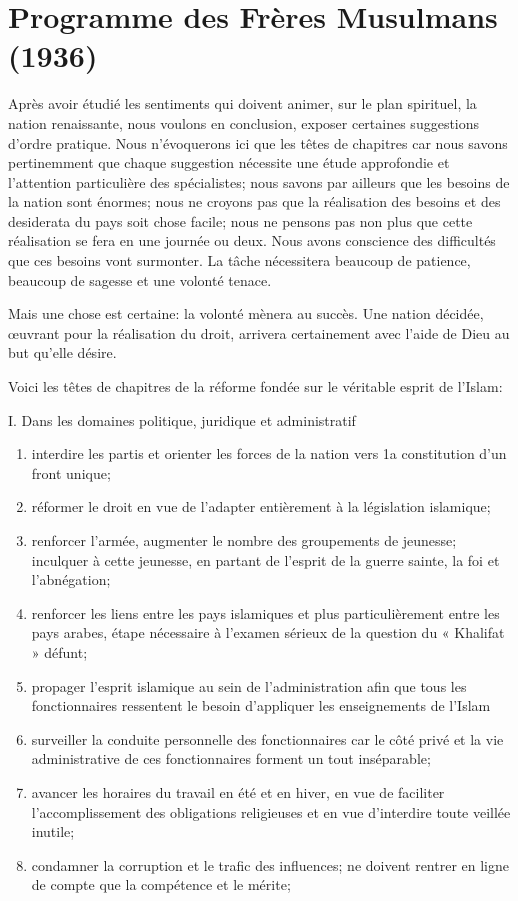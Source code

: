 \section{Programme des Frères Musulmans (1936)}

Après avoir étudié les sentiments qui doivent animer, sur le plan
spirituel, la nation renaissante, nous voulons en conclusion, exposer
certaines suggestions d'ordre pratique. Nous n'évoquerons ici que les
têtes de chapitres car nous savons pertinemment que chaque suggestion
nécessite une étude approfondie et l'attention particulière des
spécialistes; nous savons par ailleurs que les besoins de la nation sont
énormes; nous ne croyons pas que la réalisation des besoins et des
desiderata du pays soit chose facile; nous ne pensons pas non plus que
cette réalisation se fera en une journée ou deux. Nous avons conscience
des difficultés que ces besoins vont surmonter. La tâche nécessitera
beaucoup de patience, beaucoup de sagesse et une volonté tenace.

Mais une chose est certaine: la volonté mènera au succès. Une nation
décidée, œuvrant pour la réalisation du droit, arrivera certainement
avec l'aide de Dieu au but qu'elle désire.

Voici les têtes de chapitres de la réforme fondée sur le véritable
esprit de l'Islam:

I. Dans les domaines politique, juridique et administratif

\begin{enumerate}
\def\labelenumi{\arabic{enumi})}
\item
  interdire les partis et orienter les forces de la nation vers 1a
  constitution d'un front unique;
\item
  réformer le droit en vue de l'adapter entièrement à la législation
  islamique;
\item
  renforcer l'armée, augmenter le nombre des groupements de jeunesse;
  inculquer à cette jeunesse, en partant de l'esprit de la guerre
  sainte, la foi et l'abnégation;
\item
  renforcer les liens entre les pays islamiques et plus particulièrement
  entre les pays arabes, étape nécessaire à l'examen sérieux de la
  question du « Khalifat » défunt;
\item
  propager l'esprit islamique au sein de l'administration afin que tous
  les fonctionnaires ressentent le besoin d'appliquer les enseignements
  de l'Islam
\item
  surveiller la conduite personnelle des fonctionnaires car le côté
  privé et la vie administrative de ces fonctionnaires forment un tout
  inséparable;
\item
  avancer les horaires du travail en été et en hiver, en vue de
  faciliter l'accomplissement des obligations religieuses et en vue
  d'interdire toute veillée inutile;
\item
  condamner la corruption et le trafic des influences; ne doivent
  rentrer en ligne de compte que la compétence et le mérite;
\end{enumerate}

